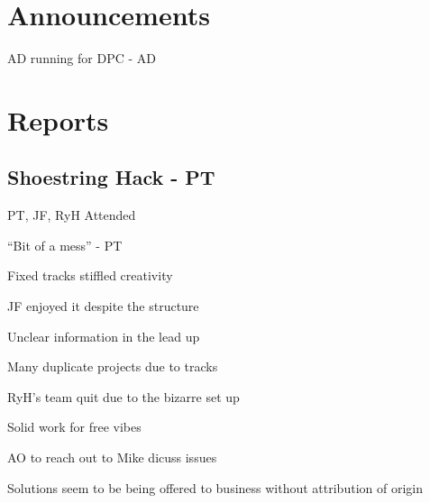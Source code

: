 \documentclass[11pt,hacksoc]{meetingmins}
\begin{document}
\maketitle

\section{Announcements}
\begin{items}
\item AD running for DPC - AD
\end{items}

\section{Reports}
\subsection{Shoestring Hack - PT}
\begin{hiddensubitems}
\item PT, JF, RyH Attended
\item ``Bit of a mess'' - PT
\item Fixed tracks stiffled creativity
\item JF enjoyed it despite the structure
\item Unclear information in the lead up
\item Many duplicate projects due to tracks
\item RyH's team quit due to the bizarre set up
\item Solid work for free vibes
\item AO to reach out to Mike dicuss issues
\item Solutions seem to be being offered to business without attribution of origin
\end{hiddensubitems}
\end{document}

